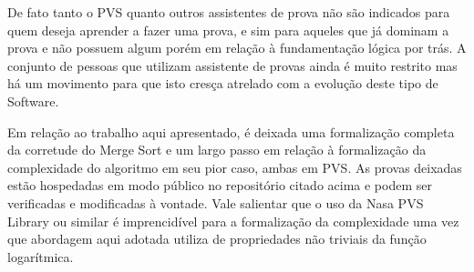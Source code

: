 \documentclass[12pt]{article}
\theoremstyle{definition}
\begin{document}
De fato tanto o PVS quanto outros assistentes de prova não são indicados para quem deseja aprender a fazer uma prova,
e sim para aqueles que já dominam a prova e não possuem algum porém em relação à fundamentação lógica por trás.
A conjunto de pessoas que utilizam assistente de provas ainda é muito restrito mas há um movimento para que isto cresça
atrelado com a evolução deste tipo de Software.

Em relação ao trabalho aqui apresentado, é deixada uma formalização completa da corretude do Merge Sort e um largo passo
em relação à formalização da complexidade do algoritmo em seu pior caso, ambas em PVS. As provas deixadas estão hospedadas
em modo público no repositório citado acima e podem ser verificadas e modificadas à vontade. Vale salientar que o uso
da Nasa PVS Library ou similar é imprencidível para a formalização da complexidade uma vez que abordagem aqui adotada utiliza
de propriedades não triviais da função logarítmica.



\end{document}
